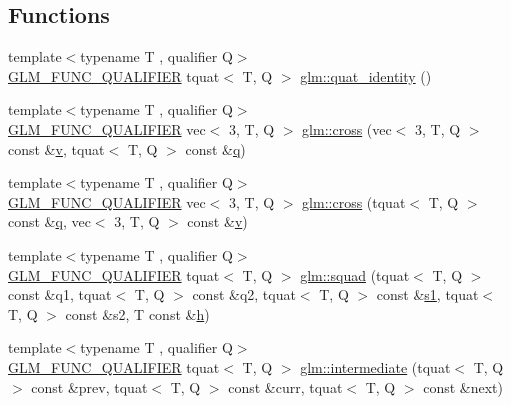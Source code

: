 \subsection*{Functions}
\begin{DoxyCompactItemize}
\item 
{\footnotesize template$<$typename T , qualifier Q$>$ }\\\hyperlink{setup_8hpp_a33fdea6f91c5f834105f7415e2a64407}{G\+L\+M\+\_\+\+F\+U\+N\+C\+\_\+\+Q\+U\+A\+L\+I\+F\+I\+ER} tquat$<$ T, Q $>$ \hyperlink{group__gtx__quaternion_ga40788ce1d74fac29fa000af893a3ceb5}{glm\+::quat\+\_\+identity} ()
\item 
{\footnotesize template$<$typename T , qualifier Q$>$ }\\\hyperlink{setup_8hpp_a33fdea6f91c5f834105f7415e2a64407}{G\+L\+M\+\_\+\+F\+U\+N\+C\+\_\+\+Q\+U\+A\+L\+I\+F\+I\+ER} vec$<$ 3, T, Q $>$ \hyperlink{group__gtx__quaternion_gaa75ca5654e0dc3b61c05db091f7d46ce}{glm\+::cross} (vec$<$ 3, T, Q $>$ const \&\hyperlink{_s_d_l__opengl_8h_a10a82eabcb59d2fcd74acee063775f90}{v}, tquat$<$ T, Q $>$ const \&\hyperlink{_s_d_l__opengl_8h_a8fc1e7b9baaae687804c7eed46ca09c6}{q})
\item 
{\footnotesize template$<$typename T , qualifier Q$>$ }\\\hyperlink{setup_8hpp_a33fdea6f91c5f834105f7415e2a64407}{G\+L\+M\+\_\+\+F\+U\+N\+C\+\_\+\+Q\+U\+A\+L\+I\+F\+I\+ER} vec$<$ 3, T, Q $>$ \hyperlink{group__gtx__quaternion_ga8639615408166d0dddda1b91a940b338}{glm\+::cross} (tquat$<$ T, Q $>$ const \&\hyperlink{_s_d_l__opengl_8h_a8fc1e7b9baaae687804c7eed46ca09c6}{q}, vec$<$ 3, T, Q $>$ const \&\hyperlink{_s_d_l__opengl_8h_a10a82eabcb59d2fcd74acee063775f90}{v})
\item 
{\footnotesize template$<$typename T , qualifier Q$>$ }\\\hyperlink{setup_8hpp_a33fdea6f91c5f834105f7415e2a64407}{G\+L\+M\+\_\+\+F\+U\+N\+C\+\_\+\+Q\+U\+A\+L\+I\+F\+I\+ER} tquat$<$ T, Q $>$ \hyperlink{group__gtx__quaternion_gacfcb16619e166e672c4672aff50a565c}{glm\+::squad} (tquat$<$ T, Q $>$ const \&q1, tquat$<$ T, Q $>$ const \&q2, tquat$<$ T, Q $>$ const \&\hyperlink{_s_d_l__opengl__glext_8h_a4ed25fb4dc5bf1a768a78d2e2f0ca003}{s1}, tquat$<$ T, Q $>$ const \&s2, T const \&\hyperlink{_s_d_l__opengl__glext_8h_afa0fb1b5e976920c0abeff2dca3ed774}{h})
\item 
{\footnotesize template$<$typename T , qualifier Q$>$ }\\\hyperlink{setup_8hpp_a33fdea6f91c5f834105f7415e2a64407}{G\+L\+M\+\_\+\+F\+U\+N\+C\+\_\+\+Q\+U\+A\+L\+I\+F\+I\+ER} tquat$<$ T, Q $>$ \hyperlink{group__gtx__quaternion_gac9be2084562a52ae8923813233563a28}{glm\+::intermediate} (tquat$<$ T, Q $>$ const \&prev, tquat$<$ T, Q $>$ const \&curr, tquat$<$ T, Q $>$ const \&next)

\end{DoxyCompactItemize}
